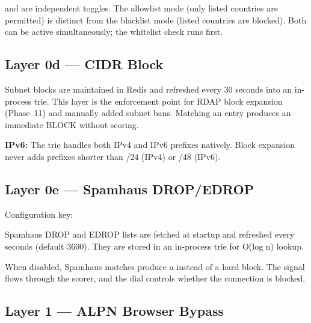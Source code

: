 \begin{notebox}
 and 
are independent toggles. The allowlist mode (only listed countries are permitted) is
distinct from the blacklist mode (listed countries are blocked). Both can be active
simultaneously; the whitelist check runs first.
\end{notebox}

\subsection{Layer 0d — CIDR Block}

Subnet blocks are maintained in Redis and refreshed every 30 seconds into an in-process
trie. This layer is the enforcement point for RDAP block expansion (Phase~11) and
manually added subnet bans. Matching an entry produces an immediate BLOCK without
scoring.

\textbf{IPv6:} The trie handles both IPv4 and IPv6 prefixes natively. Block expansion
never adds prefixes shorter than /24 (IPv4) or /48 (IPv6).

\subsection{Layer 0e — Spamhaus DROP/EDROP}

Configuration key: 

Spamhaus DROP and EDROP lists are fetched at startup and refreshed every
 seconds (default 3600). They are stored
in an in-process trie for O(log n) lookup.

When disabled, Spamhaus matches produce a  instead of a hard
block. The signal flows through the scorer, and the dial controls whether the connection
is blocked.

\subsection{Layer 1 — ALPN Browser Bypass}


